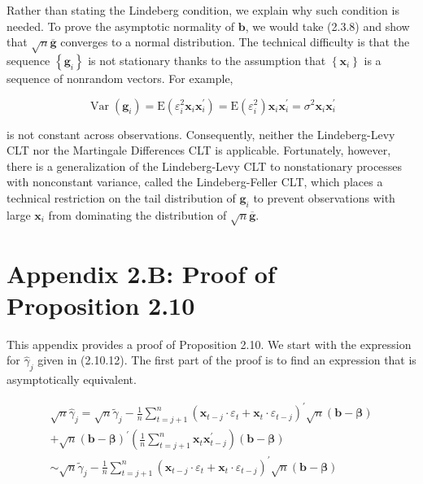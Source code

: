 \documentclass[10pt]{article}
\begin{document}
Rather than stating the Lindeberg condition, we explain why such condition is needed. To prove the asymptotic normality of $\mathbf{b}$, we would take (2.3.8) and show that $\sqrt{n} \overline{\mathbf{g}}$ converges to a normal distribution. The technical difficulty is that the sequence $\left\{\mathbf{g}_{i}\right\}$ is not stationary thanks to the assumption that $\left\{\mathbf{x}_{i}\right\}$ is a sequence of nonrandom vectors. For example,

$$
\operatorname{Var}\left(\mathbf{g}_{i}\right)=\mathrm{E}\left(\varepsilon_{i}^{2} \mathbf{x}_{i} \mathbf{x}_{i}^{\prime}\right)=\mathrm{E}\left(\varepsilon_{i}^{2}\right) \mathbf{x}_{i} \mathbf{x}_{i}^{\prime}=\sigma^{2} \mathbf{x}_{i} \mathbf{x}_{i}^{\prime}
$$

is not constant across observations. Consequently, neither the Lindeberg-Levy CLT nor the Martingale Differences CLT is applicable. Fortunately, however, there is a generalization of the Lindeberg-Levy CLT to nonstationary processes with nonconstant variance, called the Lindeberg-Feller CLT, which places a technical restriction on the tail distribution of $\mathbf{g}_{i}$ to prevent observations with large $\mathbf{x}_{i}$ from dominating the distribution of $\sqrt{n} \overline{\mathbf{g}}$.

\section*{Appendix 2.B: Proof of Proposition 2.10}
This appendix provides a proof of Proposition 2.10. We start with the expression for $\hat{\gamma}_{j}$ given in (2.10.12). The first part of the proof is to find an expression that is asymptotically equivalent.

$$
\begin{gathered}
\sqrt{n} \hat{\gamma}_{j}=\sqrt{n} \tilde{\gamma}_{j}-\frac{1}{n} \sum_{t=j+1}^{n}\left(\mathbf{x}_{t-j} \cdot \varepsilon_{t}+\mathbf{x}_{t} \cdot \varepsilon_{t-j}\right)^{\prime} \sqrt{n}(\mathbf{b}-\boldsymbol{\beta}) \\
+\sqrt{n}(\mathbf{b}-\boldsymbol{\beta})^{\prime}\left(\frac{1}{n} \sum_{t=j+1}^{n} \mathbf{x}_{t} \mathbf{x}_{t-j}^{\prime}\right)(\mathbf{b}-\boldsymbol{\beta}) \\
\sim \sqrt{n} \tilde{\gamma}_{j}-\frac{1}{n} \sum_{t=j+1}^{n}\left(\mathbf{x}_{t-j} \cdot \varepsilon_{t}+\mathbf{x}_{t} \cdot \varepsilon_{t-j}\right)^{\prime} \sqrt{n}(\mathbf{b}-\boldsymbol{\beta})
\end{gathered}
$$
\end{document}
